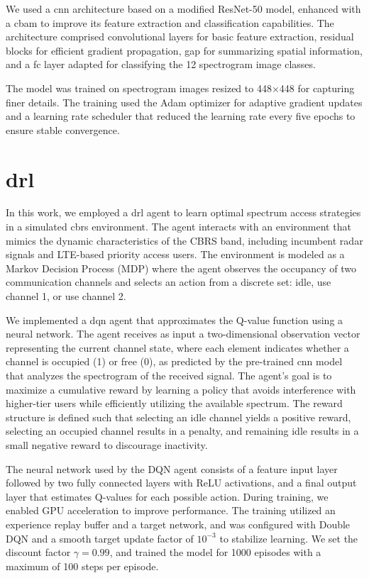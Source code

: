 We used a \gls{cnn} architecture based on a modified ResNet-50 model, enhanced with a \gls{cbam} to improve its feature extraction and classification capabilities. The architecture comprised convolutional layers for basic feature extraction, residual blocks for efficient gradient propagation, \gls{gap} for summarizing spatial information, and a \gls{fc} layer adapted for classifying the 12 spectrogram image classes.

The model was trained on spectrogram images resized to 448×448 for capturing finer details. The training used the Adam\cite{18} optimizer for adaptive gradient updates and a learning rate scheduler that reduced the learning rate every five epochs to ensure stable convergence.  

\section{\gls{drl}}

In this work, we employed a \gls{drl} agent to learn optimal spectrum access strategies in a simulated \gls{cbrs} environment. The agent interacts with an environment that mimics the dynamic characteristics of the CBRS band, including incumbent radar signals and LTE-based priority access users. The environment is modeled as a Markov Decision Process (MDP) where the agent observes the occupancy of two communication channels and selects an action from a discrete set: idle, use channel 1, or use channel 2.

We implemented a \gls{dqn} agent that approximates the Q-value function using a neural network. The agent receives as input a two-dimensional observation vector representing the current channel state, where each element indicates whether a channel is occupied (1) or free (0), as predicted by the pre-trained \gls{cnn} model that analyzes the spectrogram of the received signal. The agent’s goal is to maximize a cumulative reward by learning a policy that avoids interference with higher-tier users while efficiently utilizing the available spectrum. The reward structure is defined such that selecting an idle channel yields a positive reward, selecting an occupied channel results in a penalty, and remaining idle results in a small negative reward to discourage inactivity.

The neural network used by the DQN agent consists of a feature input layer followed by two fully connected layers with ReLU activations, and a final output layer that estimates Q-values for each possible action. During training, we enabled GPU acceleration to improve performance. The training utilized an experience replay buffer and a target network, and was configured with Double DQN and a smooth target update factor of $10^{-3}$ to stabilize learning. We set the discount factor $\gamma=0.99$, and trained the model for 1000 episodes with a maximum of 100 steps per episode.


